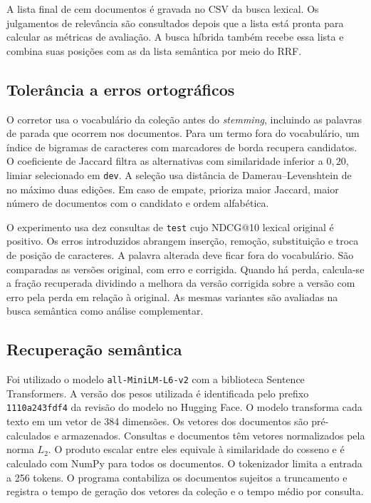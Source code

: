 \documentclass[12pt]{article}
\begin{document}
A lista final de cem documentos é gravada no CSV da busca lexical. Os
julgamentos de relevância são consultados depois que a lista está pronta
para calcular as métricas de avaliação. A busca híbrida também recebe
essa lista e combina suas posições com as da lista semântica por meio
do RRF.

\subsection{Tolerância a erros ortográficos}

O corretor usa o vocabulário da coleção antes do \textit{stemming},
incluindo as palavras de parada que ocorrem nos documentos.
Para um termo fora do vocabulário, um índice de bigramas de caracteres com
marcadores de borda recupera candidatos. O coeficiente de Jaccard filtra as
alternativas com similaridade inferior a \(0{,}20\), limiar selecionado em
\texttt{dev}. A seleção usa distância
de Damerau--Levenshtein de no máximo duas edições. Em caso de empate, prioriza
maior Jaccard, maior número de documentos com o candidato e ordem alfabética.

O experimento usa dez consultas de \texttt{test} cujo NDCG@10 lexical original
é positivo. Os erros introduzidos abrangem inserção, remoção, substituição e
troca de posição de caracteres. A palavra alterada deve ficar fora do
vocabulário. São comparadas as versões original, com erro e corrigida.
Quando há perda, calcula-se a fração recuperada dividindo a melhora da
versão corrigida sobre a versão com erro pela perda em relação à original.
As mesmas variantes são avaliadas na busca semântica como análise
complementar.

\subsection{Recuperação semântica}

Foi utilizado o modelo \texttt{all-MiniLM-L6-v2} com a biblioteca Sentence
Transformers. A versão dos pesos utilizada é identificada pelo prefixo
\texttt{1110a243fdf4} da revisão do modelo no Hugging Face. O modelo
transforma cada texto em um vetor de 384 dimensões. Os vetores dos documentos
são pré-calculados e armazenados. Consultas e documentos têm vetores
normalizados pela norma \(L_2\). O produto escalar entre eles equivale à
similaridade do cosseno e é calculado com NumPy para todos os documentos.
O tokenizador limita a entrada a 256 tokens. O programa contabiliza os
documentos sujeitos a truncamento e registra o tempo de geração dos
vetores da coleção e o tempo médio por consulta.
\end{document}
